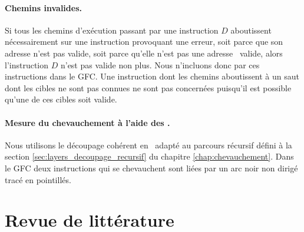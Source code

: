 \paragraph{Chemins invalides.}
Si tous les chemins d'exécution passant par une instruction $D$ aboutissent nécessairement sur une instruction provoquant une erreur, soit parce que son adresse n'est pas valide, soit parce qu'elle n'est pas une adresse \xq\ valide, alors l'instruction $D$ n'est pas valide non plus.
Nous n'incluons donc par ces instructions dans le GFC.
Une instruction dont les chemins aboutissent à un saut dont les cibles ne sont pas connues ne sont pas concernées puisqu'il est possible qu'une de ces cibles soit valide.


\paragraph{Mesure du chevauchement à l'aide des \layers.}
Nous utilisons le découpage cohérent en \layers\ adapté au parcours récursif défini à la section \ref{sec:layers_decoupage_recursif} du chapitre \ref{chap:chevauchement}.
Dans le GFC deux instructions qui se chevauchent sont liées par un arc noir non dirigé tracé en pointillés.



\section{Revue de littérature}
